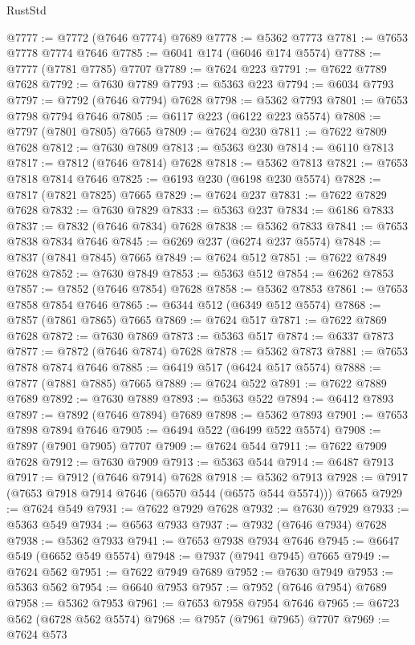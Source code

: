 \begin{lexlean}{RustStd}
\begin{coremodule}
@7777 := @7772 (@7646 @7774) @7689
@7778 := @5362 @7773
@7781 := @7653 @7778 @7774 @7646
@7785 := @6041 @174 (@6046 @174 @5574)
@7788 := @7777 (@7781 @7785) @7707
@7789 := @7624 @223
@7791 := @7622 @7789 @7628
@7792 := @7630 @7789
@7793 := @5363 @223
@7794 := @6034 @7793
@7797 := @7792 (@7646 @7794) @7628
@7798 := @5362 @7793
@7801 := @7653 @7798 @7794 @7646
@7805 := @6117 @223 (@6122 @223 @5574)
@7808 := @7797 (@7801 @7805) @7665
@7809 := @7624 @230
@7811 := @7622 @7809 @7628
@7812 := @7630 @7809
@7813 := @5363 @230
@7814 := @6110 @7813
@7817 := @7812 (@7646 @7814) @7628
@7818 := @5362 @7813
@7821 := @7653 @7818 @7814 @7646
@7825 := @6193 @230 (@6198 @230 @5574)
@7828 := @7817 (@7821 @7825) @7665
@7829 := @7624 @237
@7831 := @7622 @7829 @7628
@7832 := @7630 @7829
@7833 := @5363 @237
@7834 := @6186 @7833
@7837 := @7832 (@7646 @7834) @7628
@7838 := @5362 @7833
@7841 := @7653 @7838 @7834 @7646
@7845 := @6269 @237 (@6274 @237 @5574)
@7848 := @7837 (@7841 @7845) @7665
@7849 := @7624 @512
@7851 := @7622 @7849 @7628
@7852 := @7630 @7849
@7853 := @5363 @512
@7854 := @6262 @7853
@7857 := @7852 (@7646 @7854) @7628
@7858 := @5362 @7853
@7861 := @7653 @7858 @7854 @7646
@7865 := @6344 @512 (@6349 @512 @5574)
@7868 := @7857 (@7861 @7865) @7665
@7869 := @7624 @517
@7871 := @7622 @7869 @7628
@7872 := @7630 @7869
@7873 := @5363 @517
@7874 := @6337 @7873
@7877 := @7872 (@7646 @7874) @7628
@7878 := @5362 @7873
@7881 := @7653 @7878 @7874 @7646
@7885 := @6419 @517 (@6424 @517 @5574)
@7888 := @7877 (@7881 @7885) @7665
@7889 := @7624 @522
@7891 := @7622 @7889 @7689
@7892 := @7630 @7889
@7893 := @5363 @522
@7894 := @6412 @7893
@7897 := @7892 (@7646 @7894) @7689
@7898 := @5362 @7893
@7901 := @7653 @7898 @7894 @7646
@7905 := @6494 @522 (@6499 @522 @5574)
@7908 := @7897 (@7901 @7905) @7707
@7909 := @7624 @544
@7911 := @7622 @7909 @7628
@7912 := @7630 @7909
@7913 := @5363 @544
@7914 := @6487 @7913
@7917 := @7912 (@7646 @7914) @7628
@7918 := @5362 @7913
@7928 := @7917 (@7653 @7918 @7914 @7646 (@6570 @544 (@6575 @544 @5574))) @7665
@7929 := @7624 @549
@7931 := @7622 @7929 @7628
@7932 := @7630 @7929
@7933 := @5363 @549
@7934 := @6563 @7933
@7937 := @7932 (@7646 @7934) @7628
@7938 := @5362 @7933
@7941 := @7653 @7938 @7934 @7646
@7945 := @6647 @549 (@6652 @549 @5574)
@7948 := @7937 (@7941 @7945) @7665
@7949 := @7624 @562
@7951 := @7622 @7949 @7689
@7952 := @7630 @7949
@7953 := @5363 @562
@7954 := @6640 @7953
@7957 := @7952 (@7646 @7954) @7689
@7958 := @5362 @7953
@7961 := @7653 @7958 @7954 @7646
@7965 := @6723 @562 (@6728 @562 @5574)
@7968 := @7957 (@7961 @7965) @7707
@7969 := @7624 @573

\end{coremodule}
\end{lexlean}
